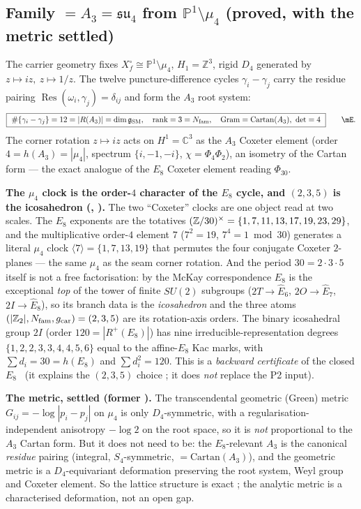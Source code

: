 \subsection{Family $=A_3=\mathfrak{su}_4$ from $\mathbb P^1\setminus\mu_4$ (proved, with the metric settled)}
The carrier geometry fixes $X_f^\circ\cong\mathbb P^1\setminus\mu_4$, $H_1=\mathbb Z^3$, rigid $D_4$ generated by
$z\mapsto iz,\ z\mapsto1/z$. The twelve puncture-difference cycles $\gamma_i-\gamma_j$ carry the
residue pairing $\operatorname{Res}(\omega_i,\gamma_j)=\delta_{ij}$ and form the $A_3$ root system:
\begin{equation}
  \boxed{\ \#\{\gamma_i-\gamma_j\}=12=|R(A_3)|=\dimg,\quad \operatorname{rank}=3=\Nfam,\quad
  \mathrm{Gram}=\mathrm{Cartan}(A_3),\ \det=4\ }\qquad\mE .
\end{equation}
The corner rotation $z\mapsto iz$ acts on $H^1=\mathbb C^3$ as the $A_3$ Coxeter element (order
$4=h(A_3)=|\mu_4|$, spectrum $\{i,-1,-i\}$, $\chi=\Phi_4\Phi_2$), an isometry of the Cartan form ---
the exact analogue of the $E_8$ Coxeter element reading $\Phi_{30}$.
\par\smallskip\noindent\textbf{The $\mu_4$ clock is the order-$4$ character of the $E_8$ cycle, and $(2,3,5)$
is the icosahedron (, ).} The two
``Coxeter'' clocks are one object read at two scales. The $E_8$ exponents are the totatives
$(\mathbb{Z}/30)^\times=\{1,7,11,13,17,19,23,29\}$, and the multiplicative order-$4$ element $7$ ($7^2{=}19$,
$7^4{=}1\bmod30$) generates a literal $\mu_4$ clock $\langle7\rangle=\{1,7,13,19\}$ that permutes the four
conjugate Coxeter $2$-planes --- the same $\mu_4$ as the seam corner rotation. And the period
$30=2{\cdot}3{\cdot}5$ itself is not a free factorisation: by the McKay correspondence $E_8$ is the
exceptional \emph{top} of the tower of finite $SU(2)$ subgroups ($2T{\to}\hat E_6$, $2O{\to}\hat E_7$,
$2I{\to}\hat E_8$), so its branch data is the \emph{icosahedron} and the three atoms $(|\mathbb{Z}_2|,N_{\mathrm{fam}},g_{\mathrm{car}})
=(2,3,5)$ are its rotation-axis orders. The binary icosahedral group $2I$ (order $120=|R^+(E_8)|$) has nine
irreducible-representation degrees $\{1,2,2,3,3,4,4,5,6\}$ equal to the affine-$E_8$ Kac marks, with
$\sum d_i=30=h(E_8)$ and $\sum d_i^2=120$. This is a \emph{backward certificate} of the closed $E_8$ \mE\
(it explains the $(2,3,5)$ choice \mC; it does \emph{not} replace the P2 input).
\par\smallskip\noindent\textbf{The metric, settled (former \mC).}
The transcendental geometric (Green) metric $G_{ij}=-\log|p_i-p_j|$ on $\mu_4$ is only
$D_4$-symmetric, with a regularisation-independent anisotropy $-\log2$ on the root space, so it is
\emph{not} proportional to the $A_3$ Cartan form. But it does not need to be: the $E_8$-relevant $A_3$
is the canonical \emph{residue} pairing (integral, $S_4$-symmetric, $=\mathrm{Cartan}(A_3)$), and the
geometric metric is a $D_4$-equivariant deformation preserving the root system, Weyl group and Coxeter
element. So the lattice structure is exact \mE; the analytic metric is a characterised deformation,
not an open gap.
\par\smallskip

